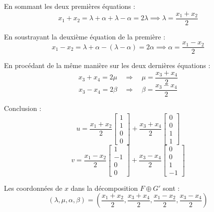 \documentclass[10pt,a4paper]{article}
\begin{document}
En sommant les deux premières équations :
\[
x_1 + x_2 = \lambda + \alpha + \lambda - \alpha = 2\lambda
\implies
\lambda = \frac{x_1 + x_2}{2}
\]

En soustrayant la deuxième équation de la première :
\[
x_1 - x_2 = \lambda + \alpha - (\lambda - \alpha) = 2\alpha
\implies
\alpha = \frac{x_1 - x_2}{2}
\]

En procédant de la même manière sur les deux dernières équations :
\[
x_3 + x_4 = 2\mu \quad \Rightarrow \quad \mu = \frac{x_3 + x_4}{2}
\]
\[
x_3 - x_4 = 2\beta \quad \Rightarrow \quad \beta = \frac{x_3 - x_4}{2}
\]

Conclusion :
\[
u = \frac{x_1 + x_2}{2} \begin{bmatrix} 1 \\ 1 \\ 0 \\ 0 \end{bmatrix} + \frac{x_3 + x_4}{2} \begin{bmatrix} 0 \\ 0 \\ 1 \\ 1 \end{bmatrix}
\]
\[
v = \frac{x_1 - x_2}{2} \begin{bmatrix} 1 \\ -1 \\ 0 \\ 0 \end{bmatrix} + \frac{x_3 - x_4}{2} \begin{bmatrix} 0 \\ 0 \\ 1 \\ -1 \end{bmatrix}
\]

Les coordonnées de \( x \) dans la décomposition \( F \oplus G' \) sont :
\[
(\lambda, \mu, \alpha, \beta) = \left( \frac{x_1 + x_2}{2}, \frac{x_3 + x_4}{2}, \frac{x_1 - x_2}{2}, \frac{x_3 - x_4}{2} \right)
\]
\end{document}
